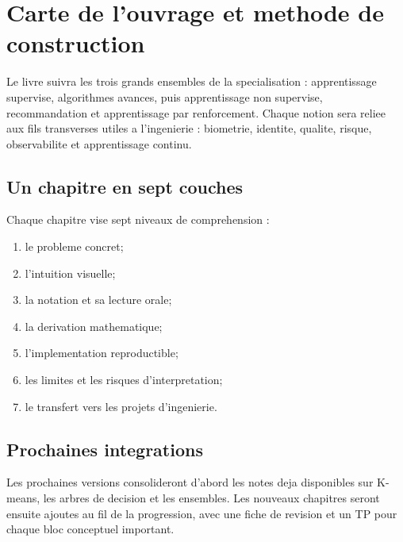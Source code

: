 \chapter{Carte de l'ouvrage et methode de construction}

Le livre suivra les trois grands ensembles de la specialisation : apprentissage
supervise, algorithmes avances, puis apprentissage non supervise, recommandation
et apprentissage par renforcement. Chaque notion sera reliee aux fils
transverses utiles a l'ingenierie : biometrie, identite, qualite, risque,
observabilite et apprentissage continu.

\section{Un chapitre en sept couches}

Chaque chapitre vise sept niveaux de comprehension :
\begin{enumerate}
  \item le probleme concret;
  \item l'intuition visuelle;
  \item la notation et sa lecture orale;
  \item la derivation mathematique;
  \item l'implementation reproductible;
  \item les limites et les risques d'interpretation;
  \item le transfert vers les projets d'ingenierie.
\end{enumerate}

\section{Prochaines integrations}

Les prochaines versions consolideront d'abord les notes deja disponibles sur
K-means, les arbres de decision et les ensembles. Les nouveaux chapitres seront
ensuite ajoutes au fil de la progression, avec une fiche de revision et un TP
pour chaque bloc conceptuel important.

